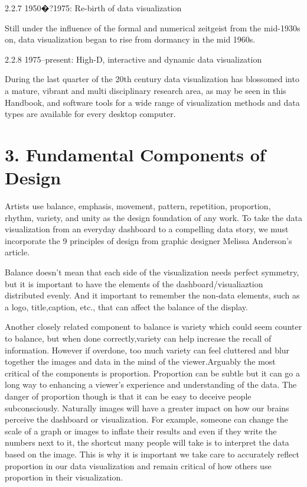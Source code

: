 \documentclass[]{book}
\theoremstyle{definition}
\theoremstyle{definition}
\theoremstyle{definition}
\theoremstyle{remark}
\begin{document}
2.2.7 1950�?1975: Re-birth of data visualization

Still under the influence of the formal and numerical zeitgeist from the
mid-1930s on, data visualization began to rise from dormancy in the mid
1960s.

2.2.8 1975--present: High-D, interactive and dynamic data visualization

During the last quarter of the 20th century data visualization has
blossomed into a mature, vibrant and multi disciplinary research area,
as may be seen in this Handbook, and software tools for a wide range of
visualization methods and data types are available for every desktop
computer.

\section{3. Fundamental Components of
Design}\label{fundamental-components-of-design-1}

Artists use balance, emphasis, movement, pattern, repetition,
proportion, rhythm, variety, and unity as the design foundation of any
work. To take the data visualization from an everyday dashboard to a
compelling data story, we must incorporate the 9 principles of design
from graphic designer Melissa Anderson's article.

Balance doesn't mean that each side of the visualization needs perfect
symmetry, but it is important to have the elements of the
dashboard/visualiaztion distributed evenly. And it important to remember
the non-data elements, such as a logo, title,caption, etc., that can
affect the balance of the display.

Another closely related component to balance is variety which could seem
counter to balance, but when done correctly,variety can help increase
the recall of information. However if overdone, too much variety can
feel cluttered and blur together the images and data in the mind of the
viewer.Arguably the most critical of the components is proportion.
Proportion can be subtle but it can go a long way to enhancing a
viewer's experience and understanding of the data. The danger of
proportion though is that it can be easy to deceive people
subconsciously. Naturally images will have a greater impact on how our
brains perceive the dashboard or visualization. For example, someone can
change the scale of a graph or images to inflate their results and even
if they write the numbers next to it, the shortcut many people will take
is to interpret the data based on the image. This is why it is important
we take care to accurately reflect proportion in our data visualization
and remain critical of how others use proportion in their visualization.
\end{document}
